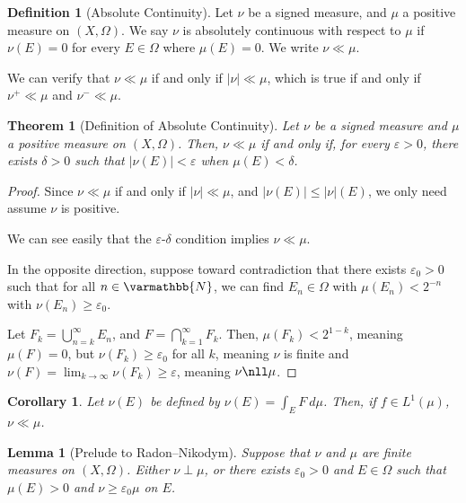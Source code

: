 \documentclass[10pt]{extarticle}
\newcommand{\N}{\mathbb{N}}
\newcommand{\ve}{\varepsilon}
\theoremstyle{plain}
\newtheorem*{theorem}{Theorem}
\newtheorem*{lemma}{Lemma}
\newtheorem*{corollary}{Corollary}
\theoremstyle{definition}
\newtheorem*{definition}{Definition}
\theoremstyle{note}
\renewcommand*{\mathbb}[1]{\varmathbb{#1}}
\renewcommand{\newline}{\hfill\break}
\begin{document}
\begin{definition}[Absolute Continuity]
Let $\nu$ be a signed measure, and $\mu$ a positive measure on $(X,\Omega)$. We say $\nu$ is absolutely continuous with respect to $\mu$ if $\nu(E) = 0$ for every $E\in \Omega$ where $\mu(E) = 0$. We write $\nu \ll \mu$.\newline

We can verify that $\nu \ll \mu$ if and only if $|\nu| \ll \mu$, which is true if and only if $\nu^{+}\ll \mu$ and $\nu^{-}\ll \mu$.
\end{definition}
\begin{theorem}[Definition of Absolute Continuity]
  Let $\nu$ be a signed measure and $\mu$ a positive measure on $(X,\Omega)$. Then, $\nu \ll \mu$ if and only if, for every $\ve > 0$, there exists $\delta > 0$ such that $\left\vert \nu(E) \right\vert < \ve$ when $\mu\left(E\right)< \delta$.
\end{theorem}
\begin{proof}
  Since $\nu \ll \mu$ if and only if $\left\vert \nu \right\vert\ll\mu$, and $\left\vert \nu(E) \right\vert\leq \left\vert \nu \right\vert\left(E\right)$, we only need assume $\nu$ is positive.\newline

  We can see easily that the $\ve$-$\delta$ condition implies $\nu \ll \mu$.\newline

  In the opposite direction, suppose toward contradiction that there exists $\ve_0 > 0$ such that for all $n\in \N$, we can find $E_n\in \Omega$ with $\mu\left(E_n\right) < 2^{-n}$ with $\nu\left(E_n\right) \geq \ve_0$.\newline

  Let $F_k = \bigcup_{n=k}^{\infty}E_n$, and $F = \bigcap_{k=1}^{\infty}F_k$. Then, $\mu\left(F_k\right) < 2^{1-k}$, meaning $\mu(F) = 0$, but $\nu\left(F_k\right) \geq \ve_0$ for all $k$, meaning $\nu$ is finite and $\nu\left(F\right) = \lim_{k\rightarrow\infty}\nu\left(F_k\right) \geq \ve$, meaning $\nu \nll \mu$.
\end{proof}
\begin{corollary}
  Let $\nu(E)$ be defined by $\nu(E) = \int_{E}^{} F\:d\mu$. Then, if $f\in L^{1}\left(\mu\right)$, $\nu \ll \mu$.
\end{corollary}
\begin{lemma}[Prelude to Radon--Nikodym]
  Suppose that $\nu$ and $\mu$ are finite measures on $(X,\Omega)$. Either $\nu \perp \mu$, or there exists $\ve_0 > 0$ and $E\in \Omega$ such that $\mu(E) > 0$ and $\nu \geq \ve_0 \mu$ on $E$.
\end{lemma}
\end{document}
